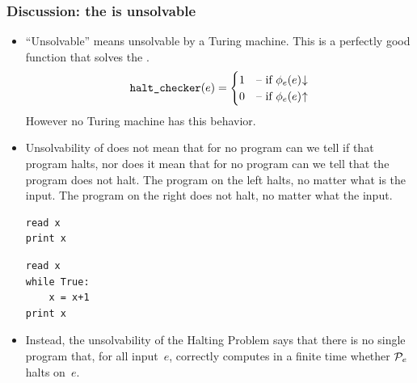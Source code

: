 \documentclass[9pt,t,serif,professionalfont,xcolor={table,dvipsnames},noamsthm]{beamer}
\begin{document}
\begin{frame}[fragile]
  \frametitle{Discussion: the \HP{} is unsolvable}

\begin{itemize}
\item ``Unsolvable'' means unsolvable by a Turing machine.
  This is a perfectly good function that solves the \HP.
  \begin{equation*}
    \computablefunction{halt\_checker}(e)=
    \begin{cases}
      1  &\case{if $\TMfcn_e(e)\converges$}  \\
      0  &\case{if $\TMfcn_e(e)\diverges$}  \\
    \end{cases}
  \end{equation*}
  However no Turing machine has this behavior.

\item
Unsolvability of \HP{} 
does not mean that for no program can we tell if that program halts, 
nor does it mean that for no program can we tell that the program does not halt.
The program on the left halts, no matter what is the input.
The program on the right does not halt, no matter what the input.
\begin{center}
\vspace*{-\ht\strutbox}
\begin{minipage}[t]{0.4\linewidth}%
\begin{lstlisting}
read x
print x
\end{lstlisting}%
\end{minipage}%
\hspace*{2em plus 0.5fil}
\begin{minipage}[t]{0.4\linewidth}%
\begin{lstlisting}
read x
while True:
    x = x+1
print x
\end{lstlisting}%
\end{minipage}%
\end{center}

\item
Instead, the unsolvability of the Halting Problem 
says that there is no single program that, for all input~$e$, 
correctly computes in a finite time whether $\mathcal{P}_e$ halts on~$e$.
\end{itemize}
\end{frame}
\end{document}
